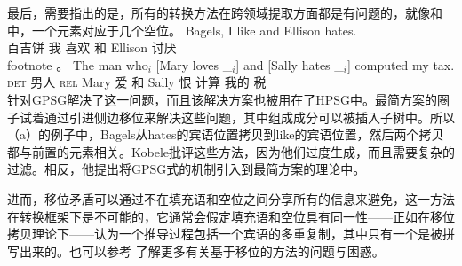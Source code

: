 最后，需要指出的是，所有的转换方法在跨领域提取方面都是有问题的，就像和中，一个元素对应于几个空位。
\eal
\label{ex-atb-minimalism}
\ex\label{ex-bagels-i-like-and-ellison-hates}
\gll Bagels, I like and Ellison hates.\\
	百吉饼 我 喜欢 和 Ellison 讨厌\\
footnote{%
   。
}
\ex 
\gll The          man who$_i$ [Mary loves \_$_i$] and [Sally hates \_$_i$] computed my tax.\\
     \textsc{det} 男人 \textsc{rel} Mary 爱 {} 和 Sally 恨 {} 计算 我的 税\\
\zl
 \citet{Gazdar81}针对GPSG解决了这一问题，而且该解决方案也被用在了HPSG中。最简方案的圈子试着通过引进侧边移位来解决这些问题\citep{Nunes2004a-u}，其中组成成分可以被插入子树中。所以（a）的例子中，Bagels从hates的宾语位置拷贝到like的宾语位置，然后两个拷贝都与前置的元素相关。Kobele批评这些方法，因为他们过度生成，而且需要复杂的过滤。相反，他提出将GPSG式的\slaschc 机制引入到最简方案的理论中\citep{Kobele2008a}。

进而，移位矛盾\citep[\S~2]{Bresnan2001a}可以通过不在填充语和空位之间分享所有的信息来避免，这一方法在转换框架下是不可能的，它通常会假定填充语和空位具有同一性——正如在移位拷贝理论下——认为一个推导过程包括一个宾语的多重复制，其中只有一个是被拼写出来的。也可以参考 了解更多有关基于移位的方法的问题与困惑。 

